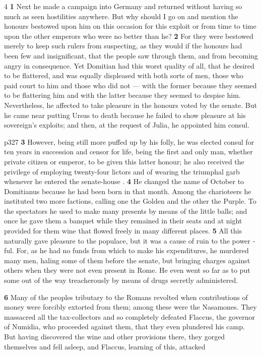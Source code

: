 4 \textbf{1} Next he made a campaign into Germany and returned without having so much as seen hostilities anywhere. But why should I go on and mention the honours bestowed upon him on this occasion for this exploit or from time to time upon the other emperors who were no better than he? \textbf{2} For they were bestowed merely to keep such rulers from suspecting, as they would if the honours had been few and insignificant, that the people saw through them, and from becoming angry in consequence. Yet Domitian had this worst quality of all, that he desired to be flattered, and was equally displeased with both sorts of men, those who paid court to him and those who did not \texthebrew{—} with the former because they seemed to be flattering him and with the latter because they seemed to despise him. Nevertheless, he affected to take pleasure in the honours voted by the senate. But he came near putting Ursus to death because he failed to show pleasure at his sovereign's exploits; and then, at the request of Julia, he appointed him consul.

p327
\textbf{3} However, being still more puffed up by his folly, he was elected consul for ten years in succession and censor for life, being the first and only man, whether private citizen or emperor, to be given this latter honour; he also received the privilege of employing twenty-four lictors and of wearing the triumphal garb whenever he entered the senate-house . \textbf{4} He changed the name of October to Domitianus because he had been born in that month. Among the charioteers he instituted two more factions, calling one the Golden and the other the Purple. To the spectators he used to make many presents by means of the little balls; and once he gave them a banquet while they remained in their seats and at night provided for them wine that flowed freely in many different places. \textbf{5} All this naturally gave pleasure to the populace, but it was a cause of ruin to the power ­ful. For, as he had no funds from which to make his expenditures, he murdered many men, haling some of them before the senate, but bringing charges against others when they were not even present in Rome. He even went so far as to put some out of the way treacherously by means of drugs secretly administered.

\textbf{6} Many of the peoples tributary to the Romans revolted when contributions of money were forcibly extorted from them; among these were the Nasamones. They massacred all the tax-collectors and so completely defeated Flaccus, the governor of Numidia, who proceeded against them, that they even plundered his camp. But having discovered the wine and other provisions there, they gorged themselves and fell asleep, and Flaccus, learning of this, attacked

